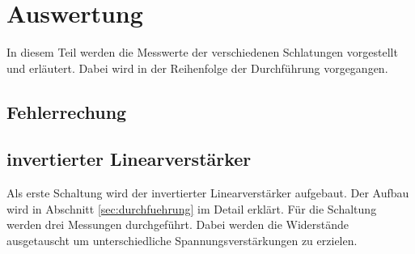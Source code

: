 \section{Auswertung}
\label{sec:auswertung}
In diesem Teil werden die Messwerte der verschiedenen Schlatungen vorgestellt und erläutert.
Dabei wird in der Reihenfolge der Durchführung vorgegangen.
\subsection{Fehlerrechung}

\subsection{invertierter Linearverstärker}
Als erste Schaltung wird der invertierter Linearverstärker aufgebaut.
Der Aufbau wird in Abschnitt \ref{sec:durchfuehrung} im Detail erklärt.
Für die Schaltung werden drei Messungen durchgeführt.
Dabei werden die Widerstände ausgetauscht um unterschiedliche Spannungsverstärkungen zu erzielen.


